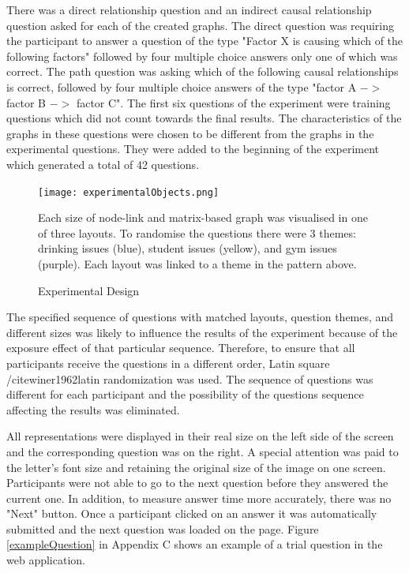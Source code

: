 \documentclass{l4proj}
\begin{document}
There was a direct relationship question and an indirect causal relationship question asked for each of the created graphs. The direct question was requiring the participant to answer a question of the type "Factor X is causing which of the following factors" followed by four multiple choice answers only one of which was correct. The path question was asking which of the following causal relationships is correct, followed by four multiple choice answers of the type "factor A $->$ factor B $->$ factor C". The first six questions of the experiment were training questions which did not count towards the final results. The characteristics of the graphs in these questions were chosen to be different from the graphs in the experimental questions. They were added to the beginning of the experiment which generated a total of 42 questions.

\begin{figure}[H]
\centering
\texttt{[image: experimentalObjects.png]}
\caption{Experimental Design}
\label{experimentalDesign}
\medskip
\small
Each size of node-link and matrix-based graph was visualised in one of three layouts. To randomise the questions there were 3 themes: drinking issues (blue), student issues (yellow), and gym issues (purple). Each layout was linked to a theme in the pattern above.
\end{figure}

The specified sequence of questions with matched layouts, question themes, and different sizes was likely to influence the results of the experiment because of the exposure effect of that particular sequence. Therefore, to ensure that all participants receive the questions in a different order, Latin square /cite{winer1962latin} randomization was used. The sequence of questions was different for each participant and the possibility of the questions sequence affecting the results was eliminated.
  
All representations were displayed in their real size on the left side of the screen and the corresponding question was on the right. A special attention was paid to the letter's font size and retaining the original size of the image on one screen. Participants were not able to go to the next question before they answered the current one. In addition, to measure answer time more accurately, there was no "Next" button. Once a participant clicked on an answer it was automatically submitted and the next question was loaded on the page. Figure \ref{exampleQuestion} in Appendix C shows an example of a trial question in the web application.
\end{document}
